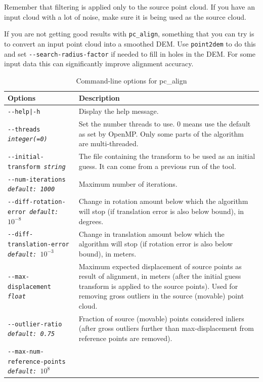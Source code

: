 Remember that filtering is applied only to the source point cloud.
If you have an input cloud with a lot of noise, make sure it is
being used as the source cloud.

If you are not getting good results with \texttt{pc\_align}, something
that you can try is to convert an input point cloud into a smoothed DEM.
Use \texttt{point2dem} to do this and set \texttt{-\/-search-radius-factor}
if needed to fill in holes in the DEM.  For some input data this can
significantly improve alignment accuracy.

\medskip

\begin{longtable}{|p{8cm}|p{9cm}|}
\caption{Command-line options for pc\_align}
\label{tbl:pcalign}
\endfirsthead
\endhead
\endfoot
\endlastfoot
\hline
Options & Description \\ \hline \hline
\texttt{-\/-help|-h} & Display the help message.\\ \hline
\texttt{-\/-threads \textit{integer(=0)}} & Set the number threads to
use. 0 means use the default as set by OpenMP. Only some parts of the algorithm are multi-threaded.\\ \hline
\texttt{-\/-initial-transform \textit{string}} &
The file containing the transform to be used as an
initial guess. It can come from a previous run of the tool. \\ \hline
\texttt{-\/-num-iterations \textit{default: 1000}} &  Maximum number of iterations. \\ \hline
\texttt{-\/-diff-rotation-error \textit{default: $10^{-8}$}} & Change in rotation amount below which the algorithm will stop (if translation error is also below bound), in degrees. \\ \hline
\texttt{-\/-diff-translation-error \textit{default: $10^{-3}$}} & Change in translation amount below which the algorithm will stop (if rotation error is also below bound), in meters. \\ \hline
\texttt{-\/-max-displacement \textit{float}} & Maximum expected
displacement of source points as result of alignment, in meters (after
the initial guess transform is applied to the source points). Used
for removing gross outliers in the source (movable) point cloud.\\ \hline
\texttt{-\/-outlier-ratio \textit{default: 0.75}} &  Fraction of source (movable) points considered inliers (after gross outliers further than max-displacement from reference points are removed). \\ \hline
\texttt{-\/-max-num-reference-points \textit{default: $10^8$}} &

\end{longtable}
